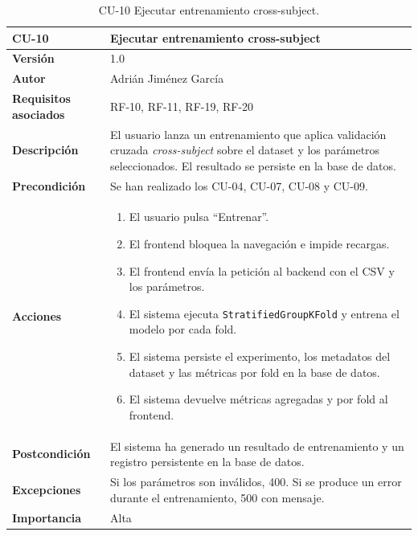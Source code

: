 \begin{table}[p]
	\centering
	\begin{tabularx}{\linewidth}{ p{} X }
		\toprule
		\textbf{CU-10}    & \textbf{Ejecutar entrenamiento cross-subject}\\
		\toprule
		\textbf{Versión}              & 1.0 \\
		\textbf{Autor}                & Adrián Jiménez García \\
		\textbf{Requisitos asociados} & RF-10, RF-11, RF-19, RF-20 \\
		\textbf{Descripción}          & El usuario lanza un entrenamiento que aplica validación cruzada \emph{cross-subject} sobre el dataset y los parámetros seleccionados. El resultado se persiste en la base de datos. \\
		\textbf{Precondición}         & Se han realizado los CU-04, CU-07, CU-08 y CU-09. \\
		\textbf{Acciones}             &
		\begin{enumerate}
			\def\labelenumi{\arabic{enumi}.}
			\tightlist
			\item El usuario pulsa ``Entrenar''.
			\item El frontend bloquea la navegación e impide recargas.
			\item El frontend envía la petición al backend con el CSV y los parámetros.
			\item El sistema ejecuta \texttt{StratifiedGroupKFold} y entrena el modelo por cada fold.
			\item El sistema persiste el experimento, los metadatos del dataset y las métricas por fold en la base de datos.
			\item El sistema devuelve métricas agregadas y por fold al frontend.
		\end{enumerate}\\
		\textbf{Postcondición}        & El sistema ha generado un resultado de entrenamiento y un registro persistente en la base de datos. \\
		\textbf{Excepciones}          & Si los parámetros son inválidos, 400. Si se produce un error durante el entrenamiento, 500 con mensaje. \\
		\textbf{Importancia}          & Alta \\
		\bottomrule
	\end{tabularx}
	\caption{CU-10 Ejecutar entrenamiento cross-subject.}
\end{table}

